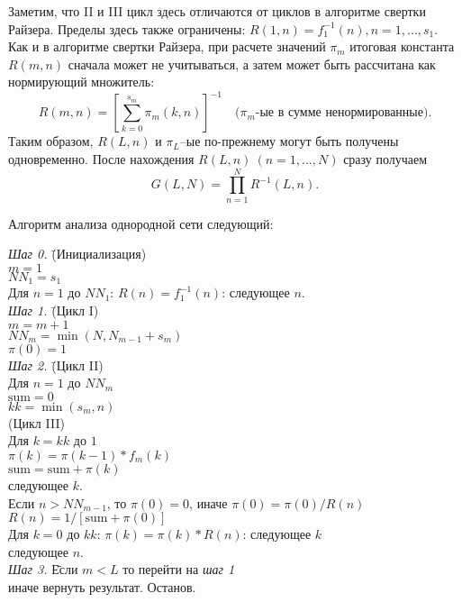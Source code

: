 Заметим, что II и III цикл здесь отличаются от циклов в алгоритме свертки Райзера. Пределы здесь также ограничены: $R(1,n) = f_1^{-1}(n), n=1,...,s_1$. Как и в алгоритме свертки Райзера, при расчете значений $\pi_m$ итоговая константа $R(m,n)$ сначала может не учитываться, а затем может быть рассчитана как нормирующий множитель:
\begin{equation*}
 R(m,n) = \left[ \sum_{k=0}^{s_m} \pi_m(k,n) \right] ^ {-1} \quad \text{(}
 \pi_m \text{-ые в сумме ненормированные)} .
\end{equation*}
Таким образом, $R(L,n)$ и $\pi_L$--ые по-прежнему могут быть получены одновременно. После нахождения $R(L,n)~(n=1,...,N)$ сразу получаем
\begin{equation}
 G(L,N) = \prod_{n=1}^N R^{-1}(L,n) .
 \label{eq:9}
\end{equation}

Алгоритм анализа однородной сети следующий:

\begin{tabbing}
\textit{Шаг 0.} \= (Инициализация) \\
\> $m = 1$ \\
\> $\textit{NN}_{1} = s_{1}$ \\
\>  Для $n=1$ до $\textit{NN}_{1}$: $R(n) = f_{1}^{-1}(n)$: следующее $n$. \\
\textit{Шаг 1.} \= (Цикл I) \\
\> $m = m + 1$ \\
\> $\textit{NN}_{m} = \min(N, N_{m-1} + s_{m})$ \\
\> $\pi(0) = 1$ \\
\textit{Шаг 2.} \= (Цикл II) \\
\> Для $n=1$ до $\textit{NN}_{m}$ \\
\> \quad $\text{sum} = 0$ \\
\> \quad $kk = \min(s_{m},n)$ \\
\> \quad (Цикл III) \\
\> \quad Для $k = kk$ до $1$ \\
\> \quad \quad $\pi(k) = \pi(k-1) * f_{m}(k)$ \\
\> \quad \quad $\text{sum} = \text{sum} + \pi(k)$ \\
\> \quad следующее $k$. \\
\> \quad Если $n > \textit{NN}_{m-1}$, то $\pi(0) = 0$, иначе $\pi(0) = \pi(0)/R(n)$ \\
\> \quad $R(n) = 1 / [\text{sum} + \pi(0)]$ \\
\> \quad Для $k = 0$ до $kk$: $\pi(k) = \pi(k) * R(n)$: следующее $k$ \\
\> следующее $n$. \\
\textit{Шаг 3.} \= Если $m < L$ то перейти на \textit{шаг 1} \\
\> иначе вернуть результат. Останов.
\end{tabbing}

